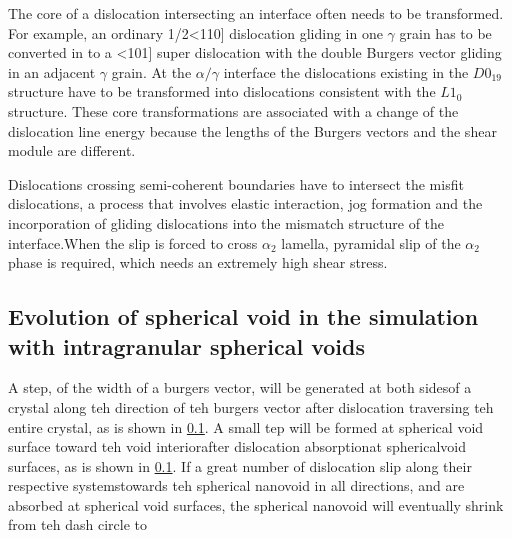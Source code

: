 \documentclass[times,12pt]{elsarticle}
\begin{document}
The core of  a dislocation intersecting an interface often needs to be transformed. For example, an ordinary 1/2<110] dislocation gliding in one $\gamma$ grain has to be converted in to a <101] super dislocation with the double Burgers vector gliding in an adjacent $\gamma$ grain. At the $\alpha/\gamma$ interface the dislocations existing in the $D0_{19}$ structure have to be transformed into dislocations consistent with the $L1_0$structure. These core transformations are associated with a change of the dislocation line energy because the lengths of the Burgers vectors and the shear module are different.
 
Dislocations crossing semi-coherent boundaries have to intersect the misfit dislocations, a process that involves elastic interaction, jog formation and the incorporation of gliding dislocations into the mismatch structure of the interface.When the slip is forced to cross $\alpha_2$ lamella, pyramidal slip of the $\alpha_2$ phase is required, which needs an extremely high shear stress.




\subsection{Evolution of spherical void in the simulation with intragranular spherical voids}
A step, of the width of a burgers vector, will be generated at both sidesof a crystal along teh direction of teh burgers vector after dislocation traversing teh entire crystal, as is shown in \ref{}. A small tep will be formed at spherical void surface toward teh void interiorafter dislocation absorptionat sphericalvoid surfaces, as is shown in \ref{}. If a great number of dislocation slip along their respective systemstowards teh spherical nanovoid in all directions, and are absorbed at spherical void surfaces, the spherical nanovoid will eventually shrink from teh dash circle to




%
\end{document}
